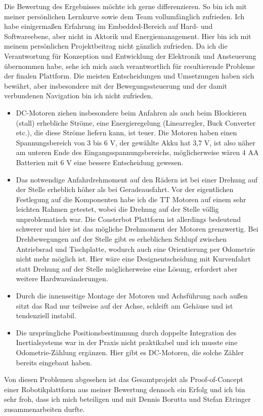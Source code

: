 

Die Bewertung des Ergebnisses möchte ich gerne differenzieren. So bin ich mit meiner persönlichen Lernkurve sowie dem Team vollumfänglich zufrieden. Ich habe einigermaßen Erfahrung im Embedded-Bereich auf Hard- und Softwareebene, aber nicht in Aktorik und Energiemanagement. Hier bin ich mit meinem persönlichen Projektbeitrag nicht gänzlich zufrieden. Da ich die Verantwortung für Konzeption und Entwicklung der Elektronik und Ansteuerung übernommen habe, sehe ich mich auch verantwortlich für resultierende Probleme der finalen Plattform. Die meisten Entscheidungen und Umsetzungen haben sich bewährt, aber insbesondere mit der Bewegungssteuerung und der damit verbundenen Navigation bin ich nicht zufrieden.

\begin{itemize}
\item DC-Motoren ziehen insbesondere beim Anfahren als auch beim Blockieren (stall) erhebliche Ströme, eine Energieregelung (Linearregler, Buck Converter etc.), die diese Ströme liefern kann, ist teuer. Die Motoren haben einen Spannungsbereich von 3 bis 6 V, der gewählte Akku hat 3,7 V, ist also näher am unteren Ende des Eingangsspannungsbereichs, möglicherweise wären 4 AA Batterien mit 6 V eine bessere Entscheidung gewesen. 

\item Das notwendige Anfahrdrehmoment auf den Rädern ist bei einer Drehung auf der Stelle erheblich höher als bei Geradeausfahrt. Vor der eigentlichen Festlegung auf die Komponenten habe ich die TT Motoren auf einem sehr leichten Rahmen getestet, wobei die Drehung auf der Stelle völlig unproblematisch war. Die Coasterbot Plattform ist allerdings bedeutend schwerer und hier ist das mögliche Drehmoment der Motoren grenzwertig. Bei Drehbewegungen auf der Stelle gibt es erheblichen Schlupf zwischen Antriebsrad und Tischplatte, wodurch auch eine Orientierung per Odometrie nicht mehr möglich ist. Hier wäre eine Designentscheidung mit Kurvenfahrt statt Drehung auf der Stelle möglicherweise eine Lösung, erfordert aber weitere Hardwareänderungen.

\item Durch die innenseitige Montage der Motoren und Achsführung nach außen sitzt das Rad nur teilweise auf der Achse, schleift am Gehäuse und ist tendenziell instabil. 

\item Die ursprüngliche Positionsbestimmung durch doppelte Integration des Inertialsystems war in der Praxis nicht praktikabel und ich musste eine Odometrie-Zählung ergänzen. Hier gibt es DC-Motoren, die solche Zähler bereits eingebaut haben. 
\end{itemize}

Von diesen Problemen abgesehen ist das Gesamtprojekt als Proof-of-Concept einer Robotikplattform aus meiner Bewertung dennoch ein Erfolg und ich bin sehr froh, dass ich mich beteiligen und mit Dennis Borutta und Stefan Etringer zusammenarbeiten durfte. 


